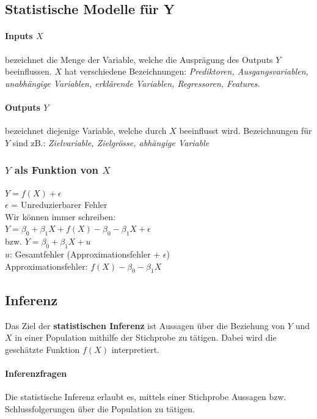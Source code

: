 \documentclass[a3paper, 8pt]{extarticle}
\begin{document}
\begin{multicols*}{5}
\section{Statistische Modelle für Y}
\paragraph{Inputs $X$} bezeichnet die Menge der Variable, welche die Ausprägung des Outputs $Y$ beeinflussen. $X$ hat verschiedene Bezeichnungen: \textit{Prediktoren, Ausgangsvariablen, unabhängige Variablen, erklärende Variablen, Regressoren, Features.}

\paragraph{Outputs $Y$} bezeichnet diejenige Variable, welche durch $X$ beeinflusst wird. Bezeichnungen für $Y$ sind zB.: \textit{Zielvariable, Zielgrösse, abhängige Variable}

\subsubsection{$Y$ als Funktion von $X$}
$Y=f(X) + \epsilon$\\
$\epsilon$ = Unreduzierbarer Fehler\\

Wir können immer schreiben:\\
$Y=\beta_0+\beta_1X+f(X)-\beta_0-\beta_1X+\epsilon$ \\bzw. $Y=\beta_0+\beta_1X+u$\\
$u$: Gesamtfehler (Approximationsfehler + $\epsilon$)\\
Approximationsfehler: $f(X)-\beta_0-\beta_1X$


\subsection{Inferenz}
Das Ziel der \textbf{statistischen Inferenz} ist Aussagen über die Beziehung von $Y$ und $X$ in einer Population mithilfe der Stichprobe zu tätigen. Dabei wird die geschätzte Funktion $f(X)$ interpretiert.

\paragraph{Inferenzfragen} Die statistische Inferenz erlaubt es, mittels einer Stichprobe Aussagen bzw. Schlussfolgerungen über die Population zu tätigen.


\end{multicols*}
\end{document}
